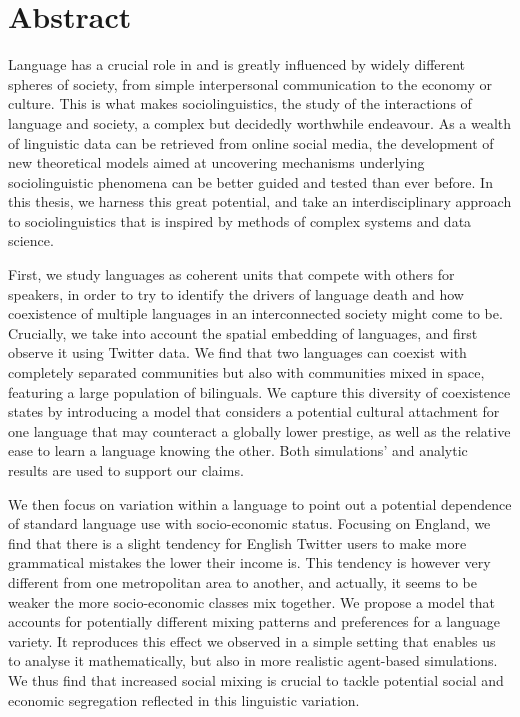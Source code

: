 \documentclass[../thesis.tex]{subfiles}
\begin{document}
\begingroup
\let\cleardoublepage\relax
\let\cleardoublepage\relax

\chapter*{Abstract}
Language has a crucial role in and is greatly influenced by widely different spheres of
society, from simple interpersonal communication to the economy or culture. This is
what makes sociolinguistics, the study of the interactions of language and society, a
complex but decidedly worthwhile endeavour. As a wealth of linguistic data can be
retrieved from online social media, the development of new theoretical models aimed at
uncovering mechanisms underlying sociolinguistic phenomena can be better guided and
tested than ever before. In this thesis, we harness this great potential, and take an
interdisciplinary approach to sociolinguistics that is inspired by methods of complex
systems and data science.

First, we study languages as coherent units that compete with others for speakers, in
order to try to identify the drivers of language death and how coexistence of multiple
languages in an interconnected society might come to be. Crucially, we take into account
the spatial embedding of languages, and first observe it using Twitter data. We find
that two languages can coexist with completely separated communities but also with
communities mixed in space, featuring a large population of bilinguals. We capture this
diversity of coexistence states by introducing a model that considers a potential
cultural attachment for one language that may counteract a globally lower prestige, as
well as the relative ease to learn a language knowing the other. Both simulations' and
analytic results are used to support our claims.

We then focus on variation within a language to point out a potential dependence of
standard language use with socio-economic status. Focusing on England, we find that
there is a slight tendency for English Twitter users to make more grammatical mistakes
the lower their income is. This tendency is however very different from one metropolitan
area to another, and actually, it seems to be weaker the more socio-economic classes mix
together. We propose a model that accounts for potentially different mixing patterns and
preferences for a language variety. It reproduces this effect we observed in a simple
setting that enables us to analyse it mathematically, but also in more realistic
agent-based simulations.
We thus find that increased social mixing is crucial to tackle potential social and
economic segregation reflected in this linguistic variation.
\end{document}
